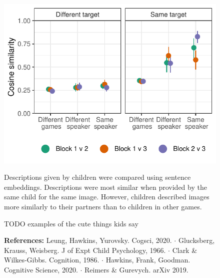 \documentclass[11pt,a4paper]{article}
\begin{document}
\begin{figure}
\begin{minipage}{.5\textwidth}
		\end{minipage}
		~~~
		\begin{minipage}{.5\textwidth}	
		{\includegraphics[width=\textwidth]{sims.pdf}} 
		\begin{small}
		Descriptions given by children were compared using sentence embeddings. Descriptions were most similar when provided by the same child for the same image. However, children described images more similarly to their partners than to children in other games.  
		\end{small}
		
		TODO examples of the cute things kids say
		\end{minipage}
	\end{figure}



\begin{figure}\textbf{References:}
Leung, Hawkins, Yurovsky. Cogsci, 2020. $\cdot$ Glucksberg, Krauss, Weisberg. J of Expt Child Psychology, 1966. $\cdot$ Clark \& Wilkes-Gibbs. Cognition, 1986. $\cdot$ Hawkins, Frank, Goodman. Cognitive Science, 2020. $\cdot$ Reimers \& Gurevych. arXiv 2019.
\end{figure}
\end{document}
